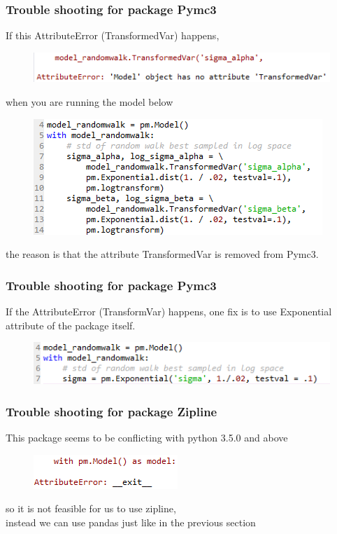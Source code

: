 \documentclass{beamer}
\begin{document}
\begin{frame}
\frametitle{Trouble shooting for package Pymc3}
If this AttributeError (TransformedVar) happens,
\begin{figure}[H]
	\includegraphics[scale=0.7]{pymc_error_4.png}
\end{figure}
when you are running the model below
\begin{figure}[H]
	\includegraphics[scale=0.7]{bayesian_random_walk.png}
\end{figure}
the reason is that the attribute TransformedVar is removed from Pymc3.
\end{frame}

\begin{frame}
\frametitle{Trouble shooting for package Pymc3}
If the AttributeError (TransformVar) happens,
one fix is to use Exponential attribute of the package itself. \\ [4mm]
\begin{figure}[H]
	\includegraphics[scale=0.7]{bayesian_random_walk_fix.png}
\end{figure}
\end{frame}

\begin{frame}
\frametitle{Trouble shooting for package Zipline}
This package seems to be conflicting with python 3.5.0 and above
\begin{figure}[H]
	\includegraphics[scale=0.7]{pymc_error_3.png}
\end{figure}
so it is not feasible for us to use zipline, \\
instead we can use pandas just like in the previous section
\end{frame}
\end{document}
